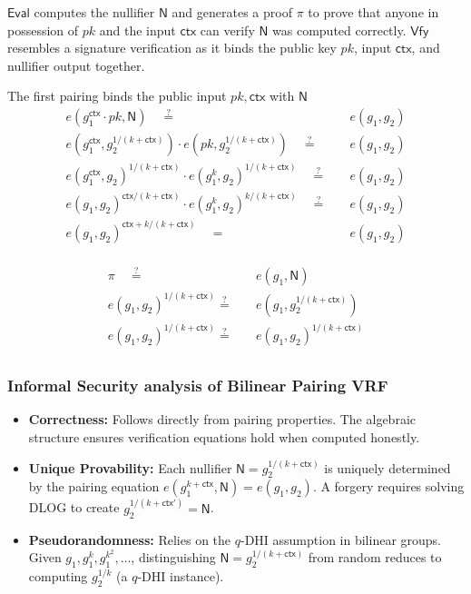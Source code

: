 $\mathsf{Eval}$ computes the nullifier $\textsf{N}$ and generates a proof $\pi$ to prove that anyone in possession of $pk$ and the input $\textsf{ctx}$ can verify $\textsf{N}$ was computed correctly. $\mathsf{Vfy}$ resembles a signature verification as it binds  the public key $pk$, input $\textsf{ctx}$, and nullifier output together. 

The first pairing binds the public input $pk, \mathsf{ctx}$ with $\mathsf{N}$
\begin{align*}
    e(g_1^\mathsf{ctx} \cdot pk, \mathsf{N})  \quad  \stackrel{?}{=}& \quad  e(g_1, g_2) \\
    e(g_1^\mathsf{ctx}, g_2^{1/(k + \mathsf{ctx})}) \cdot  e(pk, g_2^{1/(k + \mathsf{ctx})}) \quad  \stackrel{?}{=}& \quad  e(g_1, g_2) \\
    e(g_1^\mathsf{ctx}, g_2)^{1/(k + \mathsf{ctx})} \cdot  e(g_1^k, g_2)^{1/(k + \mathsf{ctx})} \quad  \stackrel{?}{=}& \quad  e(g_1, g_2) \\
    e(g_1, g_2)^{\mathsf{ctx}/(k + \mathsf{ctx})} \cdot  e(g_1^k, g_2)^{k/(k + \mathsf{ctx})} \quad  \stackrel{?}{=}& \quad  e(g_1, g_2) \\
    e(g_1, g_2)^{\mathsf{ctx} + k/(k + \mathsf{ctx})}  \quad =& \quad e(g_1, g_2) \\
\end{align*}

\begin{align*}
     \pi  \quad  \stackrel{?}{=}& \quad e(g_1, \mathsf{N}) \\
     e(g_1, g_2)^{1/(k + \textsf{ctx})}  \stackrel{?}{=}& \quad  e(g_1, g_2^{1/(k + \mathsf{ctx})}) \\
     e(g_1, g_2)^{1/(k + \textsf{ctx})}  \stackrel{?}{=}& \quad  e(g_1, g_2)^{1/(k + \textsf{ctx})} \\
\end{align*}


\subsubsection{Informal Security analysis of Bilinear Pairing VRF}
\begin{itemize}
    \item \textbf{Correctness:} Follows directly from pairing properties. The algebraic structure ensures verification equations hold when computed honestly.
    
    \item \textbf{Unique Provability:} Each nullifier $\mathsf{N} = g_2^{1/(k+\textsf{ctx})}$ is uniquely determined by the pairing equation $e(g_1^{k + \textsf{ctx}}, \mathsf{N}) = e(g_1, g_2)$. A forgery requires solving DLOG to create  $g_2^{1/(k+\textsf{ctx}')} = \mathsf{N}$.
    
    \item \textbf{Pseudorandomness:} Relies on the $q$-DHI assumption in bilinear groups. Given $g_1, g_1^k, g_1^{k^2}, \ldots$, distinguishing $\mathsf{N} = g_2^{1/(k+\textsf{ctx})}$ from random reduces to computing $g_2^{1/k}$ (a $q$-DHI instance).
\end{itemize}



